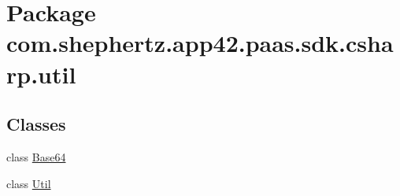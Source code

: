 \hypertarget{namespacecom_1_1shephertz_1_1app42_1_1paas_1_1sdk_1_1csharp_1_1util}{\section{Package com.\+shephertz.\+app42.\+paas.\+sdk.\+csharp.\+util}
\label{namespacecom_1_1shephertz_1_1app42_1_1paas_1_1sdk_1_1csharp_1_1util}
}
\subsection*{Classes}
\begin{DoxyCompactItemize}
\item 
class \hyperlink{classcom_1_1shephertz_1_1app42_1_1paas_1_1sdk_1_1csharp_1_1util_1_1_base64}{Base64}
\item 
class \hyperlink{classcom_1_1shephertz_1_1app42_1_1paas_1_1sdk_1_1csharp_1_1util_1_1_util}{Util}
\end{DoxyCompactItemize}
